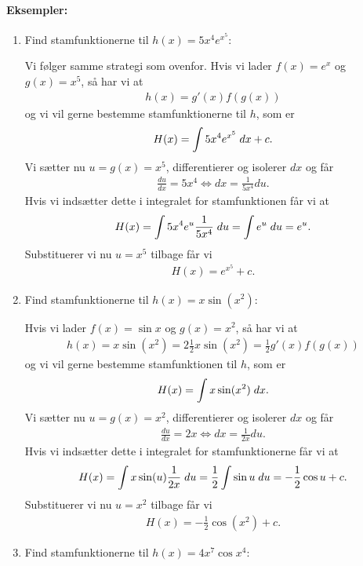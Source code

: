 \paragraph*{Eksempler:}
\begin{enumerate}
\item Find stamfunktionerne til $h(x)=5x^4e^{x^5}$:

Vi følger samme strategi som ovenfor. Hvis vi lader $f(x)=e^x$ og $g(x)=x^5$, så har vi at
\begin{align*}
h(x) = g'(x) f(g(x))
\end{align*}
og vi vil gerne bestemme stamfunktionerne til $h$, som er
\begin{align*}
H(x)= \int 5x^4 e^{x^5} \; d x +c.
\end{align*}
Vi sætter nu $u = g(x) = x^5$, differentierer og isolerer $dx$ og får
\begin{align*}
\frac{du}{dx} = 5x^4 \Leftrightarrow dx = \frac{1}{5x^4}du.
\end{align*}
Hvis vi indsætter dette i integralet for stamfunktionen får vi at
\begin{align*}
H(x) = \int 5x^4 e^u \frac{1}{5x^4} \; d u   = \int e^u \; d u  = e^u .
\end{align*}
Substituerer vi nu $u=x^5$ tilbage får vi
\begin{align*}
H(x) = e^{x^5} + c.
\end{align*}
\item Find stamfunktionerne til $h(x)=x\sin(x^2)$:

Hvis vi lader $f(x)=\sin x$ og $g(x)=x^2$, så har vi at
\begin{align*}
h(x) = x \sin (x^2) = 2\frac{1}{2}x \sin (x^2) = \frac{1}{2} g'(x)f(g(x))
\end{align*}
og vi vil gerne bestemme stamfunktionen til $h$, som er
\begin{align*}
H(x)= \int x\sin (x^2) \; d x .
\end{align*}
Vi sætter nu $u = g(x) = x^2$, differentierer og isolerer $dx$ og får
\begin{align*}
\frac{du}{dx} = 2x \Leftrightarrow dx = \frac{1}{2x}du.
\end{align*}
Hvis vi indsætter dette i integralet for stamfunktionerne får vi at
\begin{align*}
H(x) = \int  x \sin (u) \frac{1}{2x} \; d u  = \frac{1}{2}\int \sin u \; d u  = -\frac{1}{2}\cos u  +c.
\end{align*}
Substituerer vi nu $u=x^2$ tilbage får vi
\begin{align*}
H(x) = -\frac{1}{2}\cos (x^2) + c.
\end{align*}
\item Find stamfunktionerne til $h(x)=4x^7\cos x^4$:


\end{enumerate}
